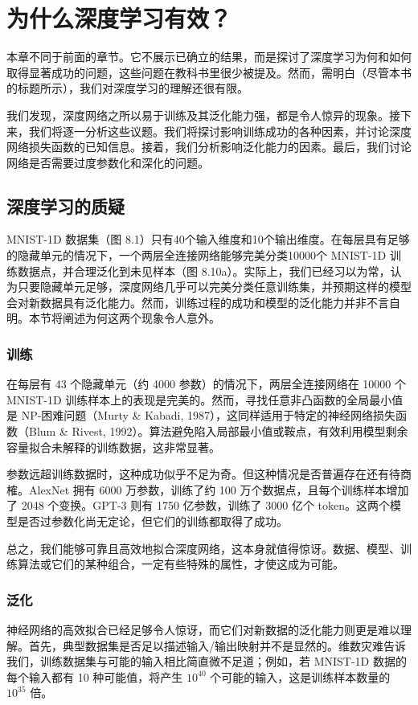 \chapter{为什么深度学习有效？}

本章不同于前面的章节。它不展示已确立的结果，而是探讨了深度学习为何和如何取得显著成功的问题，这些问题在教科书里很少被提及。然而，需明白（尽管本书的标题所示），我们对深度学习的理解还很有限。

我们发现，深度网络之所以易于训练及其泛化能力强，都是令人惊异的现象。接下来，我们将逐一分析这些议题。我们将探讨影响训练成功的各种因素，并讨论深度网络损失函数的已知信息。接着，我们分析影响泛化能力的因素。最后，我们讨论网络是否需要过度参数化和深化的问题。

\section{深度学习的质疑}
MNIST-1D 数据集（图 8.1）只有40个输入维度和10个输出维度。在每层具有足够的隐藏单元的情况下，一个两层全连接网络能够完美分类10000个 MNIST-1D 训练数据点，并合理泛化到未见样本（图 8.10a）。实际上，我们已经习以为常，认为只要隐藏单元足够，深度网络几乎可以完美分类任意训练集，并预期这样的模型会对新数据具有泛化能力。然而，训练过程的成功和模型的泛化能力并非不言自明。本节将阐述为何这两个现象令人意外。

\subsection{训练}
在每层有 43 个隐藏单元（约 4000 参数）的情况下，两层全连接网络在 10000 个 MNIST-1D 训练样本上的表现是完美的。然而，寻找任意非凸函数的全局最小值是 NP-困难问题（Murty \& Kabadi, 1987），这同样适用于特定的神经网络损失函数（Blum \& Rivest, 1992）。算法避免陷入局部最小值或鞍点，有效利用模型剩余容量拟合未解释的训练数据，这非常显著。

参数远超训练数据时，这种成功似乎不足为奇。但这种情况是否普遍存在还有待商榷。AlexNet 拥有 6000 万参数，训练了约 100 万个数据点，且每个训练样本增加了 2048 个变换。GPT-3 则有 1750 亿参数，训练了 3000 亿个 token。这两个模型是否过参数化尚无定论，但它们的训练都取得了成功。

总之，我们能够可靠且高效地拟合深度网络，这本身就值得惊讶。数据、模型、训练算法或它们的某种组合，一定有些特殊的属性，才使这成为可能。

\subsection{泛化}
神经网络的高效拟合已经足够令人惊讶，而它们对新数据的泛化能力则更是难以理解。首先，典型数据集是否足以描述输入/输出映射并不是显然的。维数灾难告诉我们，训练数据集与可能的输入相比简直微不足道；例如，若 MNIST-1D 数据的每个输入都有 10 种可能值，将产生 \(10^40\) 个可能的输入，这是训练样本数量的 \(10^35\) 倍。

